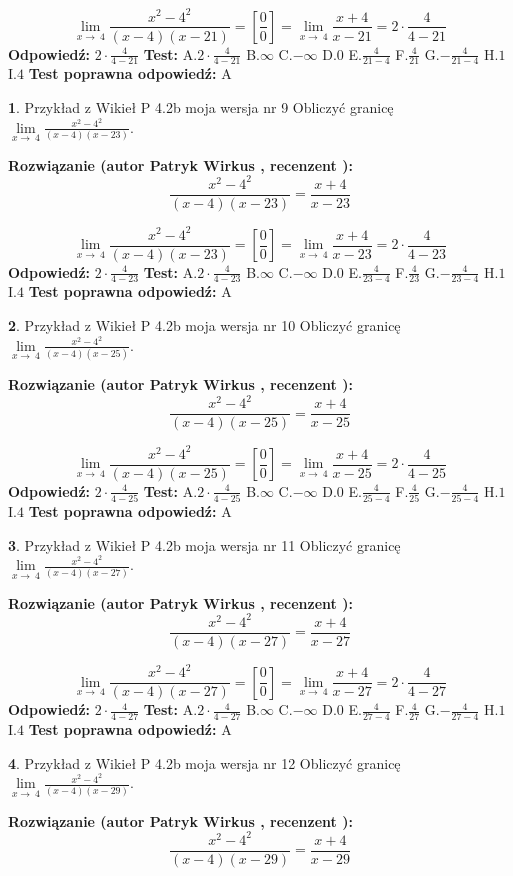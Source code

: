 \documentclass[12pt, a4paper]{article}
\theoremstyle{definition} %
\newtheorem{zad}{}
\newcommand{\zadStart}[1]{\begin{zad}#1\newline}
\newcommand{\zadStop}{\end{zad}}
\newcommand{\rozwStart}[2]{\noindent \textbf{Rozwiązanie (autor #1 , recenzent #2): }\newline}
\newcommand{\rozwStop}{\newline}
\newcommand{\odpStart}{\noindent \textbf{Odpowiedź:}\newline}
\newcommand{\odpStop}{\newline}
\newcommand{\testStart}{\noindent \textbf{Test:}\newline}
\newcommand{\testStop}{\newline}
\newcommand{\kluczStart}{\noindent \textbf{Test poprawna odpowiedź:}\newline}
\newcommand{\kluczStop}{\newline}
\begin{document}
$$\lim\limits_{x\to\ 4}\frac{x^{2}-4^{2}}{(x-4)(x-21)}=[\frac{0}{0}]=\lim\limits_{x\to\ 4}\frac{x+4}{x-21}=2 \cdot \frac{4}{4-21}$$
\rozwStop
\odpStart
$2 \cdot \frac{4}{4-21}$
\odpStop
\testStart
A.$2 \cdot \frac{4}{4-21}$
B.$\infty$
C.$-\infty$
D.$0$
E.$\frac{4}{21-4}$
F.$\frac{4}{21}$
G.$-\frac{4}{21-4}$
H.$1$
I.$4$
\testStop
\kluczStart
A
\kluczStop



\zadStart{Przykład z Wikieł P 4.2b moja wersja nr 9}
Obliczyć granicę $\lim\limits_{x\to\ 4}\frac{x^{2}-4^{2}}{(x-4)(x-23)}$.
\zadStop
\rozwStart{Patryk Wirkus}{}
$$\frac{x^{2}-4^{2}}{(x-4)(x-23)}=\frac{x+4}{x-23}$$

$$\lim\limits_{x\to\ 4}\frac{x^{2}-4^{2}}{(x-4)(x-23)}=[\frac{0}{0}]=\lim\limits_{x\to\ 4}\frac{x+4}{x-23}=2 \cdot \frac{4}{4-23}$$
\rozwStop
\odpStart
$2 \cdot \frac{4}{4-23}$
\odpStop
\testStart
A.$2 \cdot \frac{4}{4-23}$
B.$\infty$
C.$-\infty$
D.$0$
E.$\frac{4}{23-4}$
F.$\frac{4}{23}$
G.$-\frac{4}{23-4}$
H.$1$
I.$4$
\testStop
\kluczStart
A
\kluczStop



\zadStart{Przykład z Wikieł P 4.2b moja wersja nr 10}
Obliczyć granicę $\lim\limits_{x\to\ 4}\frac{x^{2}-4^{2}}{(x-4)(x-25)}$.
\zadStop
\rozwStart{Patryk Wirkus}{}
$$\frac{x^{2}-4^{2}}{(x-4)(x-25)}=\frac{x+4}{x-25}$$

$$\lim\limits_{x\to\ 4}\frac{x^{2}-4^{2}}{(x-4)(x-25)}=[\frac{0}{0}]=\lim\limits_{x\to\ 4}\frac{x+4}{x-25}=2 \cdot \frac{4}{4-25}$$
\rozwStop
\odpStart
$2 \cdot \frac{4}{4-25}$
\odpStop
\testStart
A.$2 \cdot \frac{4}{4-25}$
B.$\infty$
C.$-\infty$
D.$0$
E.$\frac{4}{25-4}$
F.$\frac{4}{25}$
G.$-\frac{4}{25-4}$
H.$1$
I.$4$
\testStop
\kluczStart
A
\kluczStop



\zadStart{Przykład z Wikieł P 4.2b moja wersja nr 11}
Obliczyć granicę $\lim\limits_{x\to\ 4}\frac{x^{2}-4^{2}}{(x-4)(x-27)}$.
\zadStop
\rozwStart{Patryk Wirkus}{}
$$\frac{x^{2}-4^{2}}{(x-4)(x-27)}=\frac{x+4}{x-27}$$

$$\lim\limits_{x\to\ 4}\frac{x^{2}-4^{2}}{(x-4)(x-27)}=[\frac{0}{0}]=\lim\limits_{x\to\ 4}\frac{x+4}{x-27}=2 \cdot \frac{4}{4-27}$$
\rozwStop
\odpStart
$2 \cdot \frac{4}{4-27}$
\odpStop
\testStart
A.$2 \cdot \frac{4}{4-27}$
B.$\infty$
C.$-\infty$
D.$0$
E.$\frac{4}{27-4}$
F.$\frac{4}{27}$
G.$-\frac{4}{27-4}$
H.$1$
I.$4$
\testStop
\kluczStart
A
\kluczStop



\zadStart{Przykład z Wikieł P 4.2b moja wersja nr 12}
Obliczyć granicę $\lim\limits_{x\to\ 4}\frac{x^{2}-4^{2}}{(x-4)(x-29)}$.
\zadStop
\rozwStart{Patryk Wirkus}{}
$$\frac{x^{2}-4^{2}}{(x-4)(x-29)}=\frac{x+4}{x-29}$$
\end{document}
